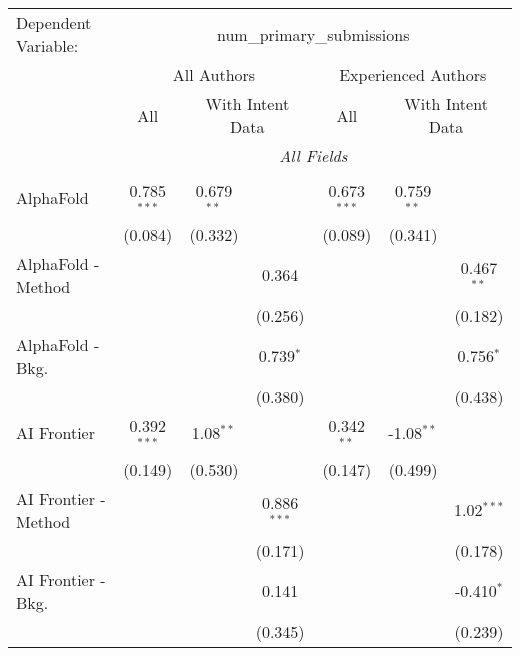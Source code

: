\begingroup
\centering
\begin{tabular}{lcccccc}
   \tabularnewline \midrule \midrule
   Dependent Variable: & \multicolumn{6}{c}{num\_primary\_submissions}\\
 & \multicolumn{3}{c}{All Authors} & \multicolumn{3}{c}{Experienced Authors} \\
\cmidrule(lr){2-4} \cmidrule(lr){5-7}
 & \multicolumn{1}{c}{All} & \multicolumn{2}{c}{With Intent Data} & \multicolumn{1}{c}{All} & \multicolumn{2}{c}{With Intent Data} \\
\cmidrule(lr){2-2} \cmidrule(lr){3-4} \cmidrule(lr){5-5} \cmidrule(lr){6-7}
 & \multicolumn{6}{c}{\textit{All Fields}} \\ \\
   AlphaFold            & 0.785$^{***}$ & 0.679$^{**}$ &               & 0.673$^{***}$ & 0.759$^{**}$ &   \\   
                        & (0.084)       & (0.332)      &               & (0.089)       & (0.341)      &   \\   
   AlphaFold - Method   &               &              & 0.364         &               &              & 0.467$^{**}$\\   
                        &               &              & (0.256)       &               &              & (0.182)\\   
   AlphaFold - Bkg.     &               &              & 0.739$^{*}$   &               &              & 0.756$^{*}$\\   
                        &               &              & (0.380)       &               &              & (0.438)\\   
   AI Frontier          & 0.392$^{***}$ & 1.08$^{**}$  &               & 0.342$^{**}$  & -1.08$^{**}$ &   \\   
                        & (0.149)       & (0.530)      &               & (0.147)       & (0.499)      &   \\   
   AI Frontier - Method &               &              & 0.886$^{***}$ &               &              & 1.02$^{***}$\\   
                        &               &              & (0.171)       &               &              & (0.178)\\   
   AI Frontier - Bkg.   &               &              & 0.141         &               &              & -0.410$^{*}$\\   
                        &               &              & (0.345)       &               &              & (0.239)\\   

\end{tabular}
